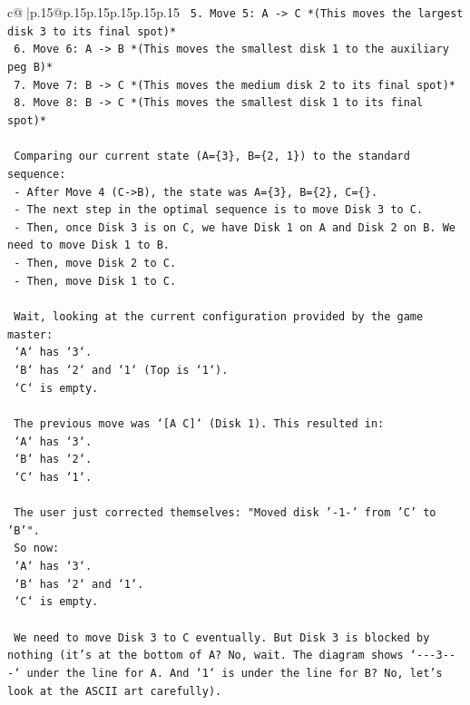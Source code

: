 \documentclass{article}
\begin{document}
{\begin{supertabular}{c@{$\;$}|p{.15\linewidth}@{}p{.15\linewidth}p{.15\linewidth}p{.15\linewidth}p{.15\linewidth}p{.15\linewidth}}
{{{\texttt{  5. Move 5: A {-}> C  *(This moves the largest disk 3 to its final spot)*} \\
\texttt{  6. Move 6: A {-}> B  *(This moves the smallest disk 1 to the auxiliary peg B)*} \\
\texttt{  7. Move 7: B {-}> C  *(This moves the medium disk 2 to its final spot)*} \\
\texttt{  8. Move 8: B {-}> C  *(This moves the smallest disk 1 to its final spot)*} \\
\\ 
\texttt{  Comparing our current state (A=\{3\}, B=\{2, 1\}) to the standard sequence:} \\
\texttt{  {-} After Move 4 (C{-}>B), the state was A=\{3\}, B=\{2\}, C=\{\}.} \\
\texttt{  {-} The next step in the optimal sequence is to move Disk 3 to C.} \\
\texttt{  {-} Then, once Disk 3 is on C, we have Disk 1 on A and Disk 2 on B. We need to move Disk 1 to B.} \\
\texttt{  {-} Then, move Disk 2 to C.} \\
\texttt{  {-} Then, move Disk 1 to C.} \\
\\ 
\texttt{  Wait, looking at the current configuration provided by the game master:} \\
\texttt{  `A` has `3`.} \\
\texttt{  `B` has `2` and `1` (Top is `1`).} \\
\texttt{  `C` is empty.} \\
\\ 
\texttt{  The previous move was `{[}A C{]}` (Disk 1). This resulted in:} \\
\texttt{  `A` has `3`.} \\
\texttt{  `B` has `2`.} \\
\texttt{  `C` has `1`.} \\
\\ 
\texttt{  The user just corrected themselves: "Moved disk '{-}1{-}' from 'C' to 'B'".} \\
\texttt{  So now:} \\
\texttt{  `A` has `3`.} \\
\texttt{  `B` has `2` and `1`.} \\
\texttt{  `C` is empty.} \\
\\ 
\texttt{  We need to move Disk 3 to C eventually. But Disk 3 is blocked by nothing (it's at the bottom of A? No, wait. The diagram shows `{-}{-}{-}3{-}{-}{-}` under the line for A. And `1` is under the line for B? No, let's look at the ASCII art carefully).} \\
}}}
\end{supertabular}}
\end{document}
